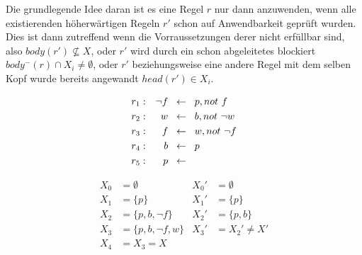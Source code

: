 Die grundlegende Idee daran ist es eine Regel $r$ nur dann anzuwenden, wenn alle
existierenden höherwärtigen Regeln $r'$ schon auf Anwendbarkeit geprüft wurden.
Dies ist dann zutreffend wenn die Vorraussetzungen derer nicht erfüllbar sind, also
$body(r') \not\subseteq X$, oder $r'$ wird durch ein schon abgeleitetes blockiert
$body^-(r) \cap X_i \neq \emptyset$, oder $r'$ beziehungsweise eine andere Regel mit
dem selben Kopf wurde bereits angewandt $head(r') \in X_i$.

\begin{minipage}{0.5\textwidth}
  \begin{example}
    \begin{align*}
      r_1: && \neg f \hspace*{0.2cm}&\leftarrow \hspace*{0.2cm}p, not~f \\
      r_2: && w \hspace*{0.2cm}&\leftarrow \hspace*{0.2cm}b, not~\neg w \\
      r_3: && f \hspace*{0.2cm}&\leftarrow \hspace*{0.2cm}w, not~\neg f \\
      r_4: && b \hspace*{0.2cm}&\leftarrow \hspace*{0.2cm}p \\
      r_5: && p \hspace*{0.2cm}&\leftarrow
    \end{align*}
  \end{example}
\end{minipage}

\begin{align*}
  X_0 &= \emptyset           & X_0' &= \emptyset \\
  X_1 &= \{p\}               & X_1' &= \{p\} \\
  X_2 &= \{p, b, \neg f\}    & X_2' &= \{p, b\} \\
  X_3 &= \{p, b, \neg f, w\} & X_3' &= X_2' \not = X' \\
  X_4 &= X_3 = X
\end{align*}









